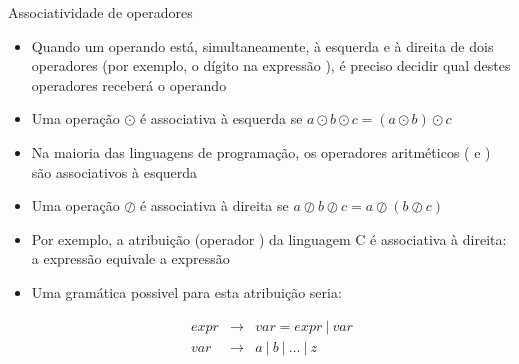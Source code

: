 \begin{frame}[fragile]{Associatividade de operadores}

    \begin{itemize}
        \item Quando um operando está, simultaneamente, à esquerda e à direita de dois operadores (por exemplo, o dígito  na expressão
            ), é preciso decidir qual destes operadores receberá o operando
        \pause

        \item Uma operação $\odot$ é associativa à esquerda se $a\odot b\odot c = (a\odot b)\odot c$
        \pause

        \item Na maioria das linguagens de programação, os operadores aritméticos ( e ) são associativos à esquerda
        \pause

        \item Uma operação $\oslash$ é associativa à direita se $a\oslash b\oslash c = a\oslash (b\oslash c)$
        \pause

        \item Por exemplo, a atribuição (operador ) da linguagem C é associativa à direita: a expressão  equivale a expressão
        \pause

        \item Uma gramática possivel para esta atribuição seria:
        \begin{footnotesize}
        \[
            \begin{array}{rcl}
                expr & \to & var = expr\ |\ var \\
                var & \to & a\ |\ b\ |\ \ldots \ |\ z
            \end{array}
        \]
        \end{footnotesize}
    \end{itemize}

\end{frame}

